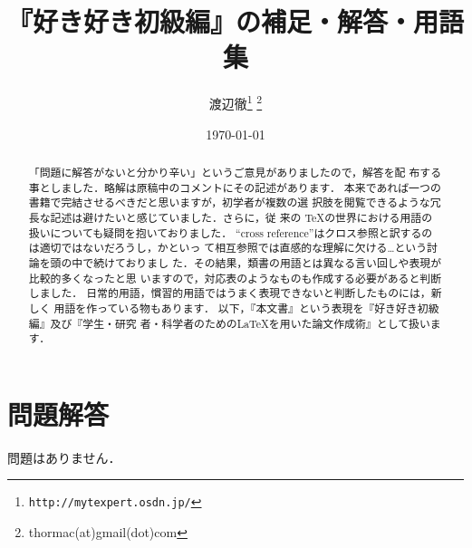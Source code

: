 \onecolumn

\title{『好き好き\LaTeXe 初級編』の補足・解答・用語集}
\author{渡辺徹\thanks{\texttt{http://mytexpert.osdn.jp/}}
  \thanks{thormac(at)gmail(dot)com}}
\date \today
\maketitle
\begin{abstract}
 「問題に解答がないと分かり辛い」というご意見がありましたので，解答を配
 布する事としました．略解は原稿中のコメントにその記述があります．
 本来であれば一つの書籍で完結させるべきだと思いますが，初学者が複数の選
 択肢を閲覧できるような冗長な記述は避けたいと感じていました．さらに，従
 来の \TeX の世界における用語の扱いについても疑問を抱いておりました．
 ``cross reference''はクロス参照と訳するのは適切ではないだろうし，かといっ
 て相互参照では直感的な理解に欠ける…という討論を頭の中で続けておりまし
 た．その結果，類書の用語とは異なる言い回しや表現が比較的多くなったと思
 いますので，対応表のようなものも作成する必要があると判断しました．
 日常的用語，慣習的用語ではうまく表現できないと判断したものには，新しく
 用語を作っている物もあります．
 以下，『本文書』という表現を『好き好き\LaTeXe 初級編』及び『学生・研究
 者・科学者のための\LaTeX を用いた論文作成術』として扱います．
\end{abstract}
\tableofcontents
\clearpage
\twocolumn

\section{問題解答}

問題はありません．

